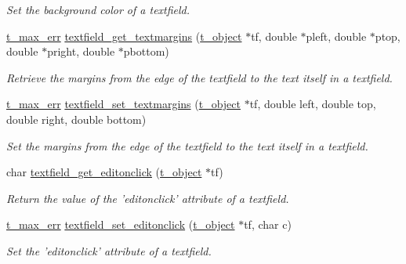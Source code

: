 \begin{DoxyCompactItemize}
\begin{DoxyCompactList}\small\item\em Set the background color of a textfield. \item\end{DoxyCompactList}\item 
\hyperlink{group__datatypes_ga73edaae82b318855cc09fac994918165}{t\_\-max\_\-err} \hyperlink{group__textfield_ga36989910e25e20b150fc0a9d9988c2ca}{textfield\_\-get\_\-textmargins} (\hyperlink{structt__object}{t\_\-object} $\ast$tf, double $\ast$pleft, double $\ast$ptop, double $\ast$pright, double $\ast$pbottom)
\begin{DoxyCompactList}\small\item\em Retrieve the margins from the edge of the textfield to the text itself in a textfield. \item\end{DoxyCompactList}\item 
\hyperlink{group__datatypes_ga73edaae82b318855cc09fac994918165}{t\_\-max\_\-err} \hyperlink{group__textfield_gaf04aceca2e8f20fed28a567d64822698}{textfield\_\-set\_\-textmargins} (\hyperlink{structt__object}{t\_\-object} $\ast$tf, double left, double top, double right, double bottom)
\begin{DoxyCompactList}\small\item\em Set the margins from the edge of the textfield to the text itself in a textfield. \item\end{DoxyCompactList}\item 
char \hyperlink{group__textfield_ga3ef42ba21834fa1ca912958267d6a3b0}{textfield\_\-get\_\-editonclick} (\hyperlink{structt__object}{t\_\-object} $\ast$tf)
\begin{DoxyCompactList}\small\item\em Return the value of the 'editonclick' attribute of a textfield. \item\end{DoxyCompactList}\item 
\hyperlink{group__datatypes_ga73edaae82b318855cc09fac994918165}{t\_\-max\_\-err} \hyperlink{group__textfield_gad8e743fff1d74b2329a0da24a97ff1a5}{textfield\_\-set\_\-editonclick} (\hyperlink{structt__object}{t\_\-object} $\ast$tf, char c)
\begin{DoxyCompactList}\small\item\em Set the 'editonclick' attribute of a textfield. \item\end{DoxyCompactList}\item 

\end{DoxyCompactItemize}
